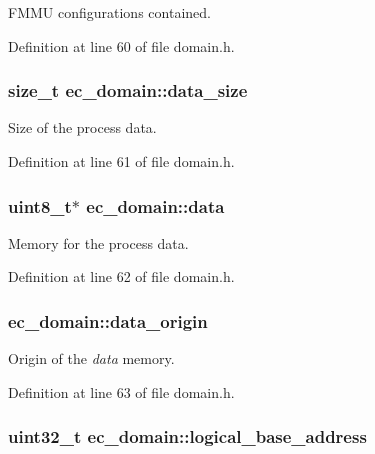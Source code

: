 \-F\-M\-M\-U configurations contained. 



\-Definition at line 60 of file domain.\-h.

\subsubsection[{data\-\_\-size}]{\setlength{\rightskip}{0pt plus 5cm}size\-\_\-t {\bf ec\-\_\-domain\-::data\-\_\-size}}\label{structec__domain_a7c2dfe55da8c96a17ace9de29e8cbb95}


\-Size of the process data. 



\-Definition at line 61 of file domain.\-h.

\subsubsection[{data}]{\setlength{\rightskip}{0pt plus 5cm}uint8\-\_\-t$\ast$ {\bf ec\-\_\-domain\-::data}}\label{structec__domain_ab6ced9980be9d70c0c610cf00e44793d}


\-Memory for the process data. 



\-Definition at line 62 of file domain.\-h.

\subsubsection[{data\-\_\-origin}]{ {\bf ec\-\_\-domain\-::data\-\_\-origin}}\label{structec__domain_a2ff57b73bc954e0ce90f1cee5d0a2721}


\-Origin of the {\itshape data\/} memory. 



\-Definition at line 63 of file domain.\-h.

\subsubsection[{logical\-\_\-base\-\_\-address}]{\setlength{\rightskip}{0pt plus 5cm}uint32\-\_\-t {\bf ec\-\_\-domain\-::logical\-\_\-base\-\_\-address}}\label{structec__domain_a5efe0cdd408c44ad61c52952f28f14de}


